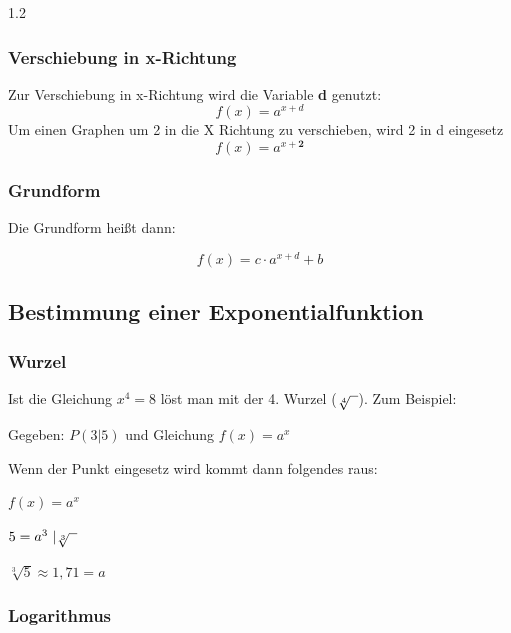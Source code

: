 \documentclass{article}
\newcommand{\Zeilenabstand}{1.2}
\newcommand{\absatz}{5mm}
\begin{document}
\begin{spacing}{\Zeilenabstand}
    \subsubsection{Verschiebung in x-Richtung}

    Zur Verschiebung in x-Richtung wird die Variable \textbf{d} genutzt:
    \begin{equation*}
        f(x)=a^{x+d}
    \end{equation*}
    Um einen Graphen um 2 in die X Richtung zu verschieben, wird 2 in d eingesetz
    \begin{equation*}
        f(x)=a^{x+\mathbf{2}}
    \end{equation*}

    \subsubsection{Grundform}

    Die Grundform heißt dann:

    \begin{equation*}
        f(x)=c\cdot a^{x+d}+b
    \end{equation*}


    \newpage
    \subsection{Bestimmung einer Exponentialfunktion}

    \subsubsection{Wurzel}

    Ist die Gleichung $x^{4}=8$ löst man mit der 4. Wurzel ($\sqrt[4]{\hspace{2mm}}$). Zum Beispiel:

    \vspace{\absatz}

    Gegeben: $P(3\vert 5)$ und Gleichung $f(x)=a^{x}$

    Wenn der Punkt eingesetz wird kommt dann folgendes raus:

    $f(x)=a^x$

    $5=a^3 \ \vert \sqrt[3]{\hspace{2mm}}$

    $\sqrt[3]{5}\approx 1,71 =a$

    \subsubsection{Logarithmus}



\end{spacing}
\end{document}
